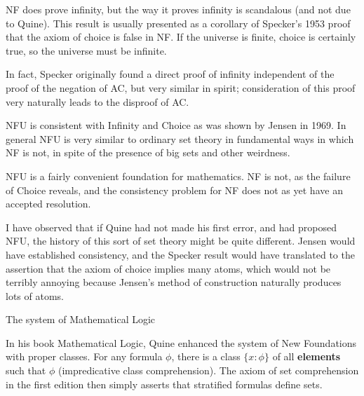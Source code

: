 \documentclass[12pt]{slides}
\begin{document}
\begin{slide}

NF does prove infinity, but the way it proves infinity is scandalous (and not due to Quine).  This result is usually presented as a corollary of Specker's 1953 proof that the axiom of choice is false in NF.  If the universe is finite, choice is certainly true, so the universe must be infinite.

In fact, Specker originally found a direct proof of infinity independent of the proof of the negation of AC, but very similar in spirit;  consideration of this proof very naturally leads to the disproof of AC.

NFU is consistent with Infinity and Choice as was shown by Jensen in 1969.  In general NFU is very similar to ordinary set theory in fundamental ways in which NF is not, in spite of the presence of big sets and other weirdness.

NFU is a fairly convenient foundation for mathematics.   NF is not, as the failure of Choice reveals, and the consistency problem for NF does not as yet have an accepted resolution.

\end{slide}

\begin{slide}

I have observed that if Quine had not made his first error, and had proposed NFU, the history of this sort of set theory might be quite different.  Jensen would have established consistency, and the Specker result would have translated to the assertion that the axiom of choice implies many atoms, which would not be terribly annoying because Jensen's method of construction naturally produces lots of atoms.


\end{slide}

\begin{slide}
 {\Large The system of Mathematical Logic}

In his book Mathematical Logic, Quine enhanced the system of New Foundations with proper classes.  For any formula $\phi$, there is a class $\{x:\phi\}$ of all {\bf elements} such that $\phi$ (impredicative class comprehension).  The axiom of set comprehension in the first edition then simply asserts that stratified formulas
define sets.

\end{slide}
\end{document}

